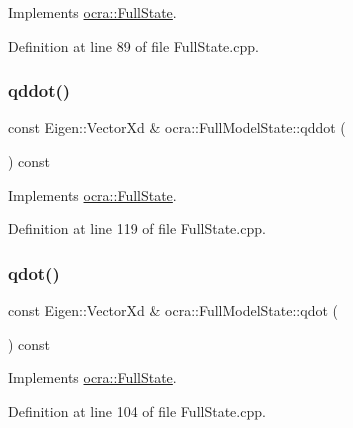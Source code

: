 Implements \hyperlink{classocra_1_1FullState_a3bb03b513d7cb3a5447d1d4eb2d643b0}{ocra\+::\+Full\+State}.



Definition at line 89 of file Full\+State.\+cpp.

\hypertarget{classocra_1_1FullModelState_a2578e15742268c14fb4ce5f26033256e}{}\label{classocra_1_1FullModelState_a2578e15742268c14fb4ce5f26033256e} 
\subsubsection{\texorpdfstring{qddot()}{qddot()}}
{\footnotesize\ttfamily const Eigen\+::\+Vector\+Xd \& ocra\+::\+Full\+Model\+State\+::qddot (\begin{DoxyParamCaption}{ }\end{DoxyParamCaption}) const\hspace{0.3cm}{\ttfamily [virtual]}}



Implements \hyperlink{classocra_1_1FullState_a5882a53273cd9d3baae36b5850deadae}{ocra\+::\+Full\+State}.



Definition at line 119 of file Full\+State.\+cpp.

\hypertarget{classocra_1_1FullModelState_a034c567bae39a29f391f6462f52b0834}{}\label{classocra_1_1FullModelState_a034c567bae39a29f391f6462f52b0834} 
\subsubsection{\texorpdfstring{qdot()}{qdot()}}
{\footnotesize\ttfamily const Eigen\+::\+Vector\+Xd \& ocra\+::\+Full\+Model\+State\+::qdot (\begin{DoxyParamCaption}{ }\end{DoxyParamCaption}) const\hspace{0.3cm}{\ttfamily [virtual]}}



Implements \hyperlink{classocra_1_1FullState_a7018fe03dc3c8b3ec95d3c2015ae60e6}{ocra\+::\+Full\+State}.



Definition at line 104 of file Full\+State.\+cpp.

